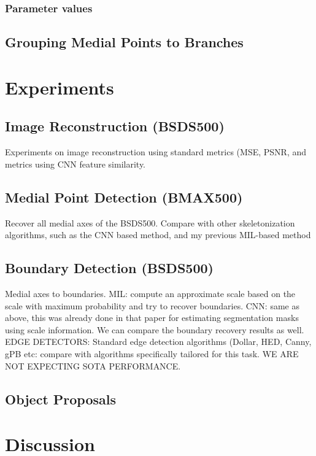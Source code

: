 \documentclass[10pt,twocolumn,letterpaper]{article}
\begin{document}
\subsubsection*{Parameter values}

\subsection{Grouping Medial Points to Branches}\label{sec:grouping}

\section{Experiments}\label{sec:experiments}
\subsection{Image Reconstruction (BSDS500)}
Experiments on image reconstruction using standard metrics (MSE, PSNR, and metrics using CNN feature similarity.

\subsection{Medial Point Detection (BMAX500)}\label{sec:medial-point-detection}
Recover all medial axes of the BSDS500. Compare with other skeletonization algorithms, such
as the CNN based method, and my previous MIL-based method

\subsection{Boundary Detection (BSDS500)}\label{sec:boundary-detection}
Medial axes to boundaries. 
MIL: compute an approximate scale based on the scale with maximum probability and try to recover boundaries.
CNN: same as above, this was already done in that paper for estimating segmentation masks using scale information.
We can compare the boundary recovery results as well.
EDGE DETECTORS: Standard edge detection algorithms (Dollar, HED, Canny, gPB etc: compare with algorithms specifically
tailored for this task. WE ARE NOT EXPECTING SOTA PERFORMANCE.

\subsection{Object Proposals}\label{sec:object-proposals}


\section{Discussion}\label{sec:discussion}

{\small


}
\end{document}

